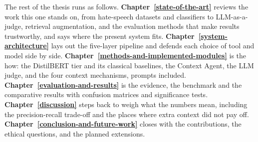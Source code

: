 The rest of the thesis runs as follows. \textbf{Chapter~\ref{state-of-the-art}} reviews the work this one stands on, from hate-speech datasets and classifiers to LLM-as-a-judge, retrieval augmentation, and the evaluation methods that make results trustworthy, and says where the present system fits. \textbf{Chapter~\ref{system-architecture}} lays out the five-layer pipeline and defends each choice of tool and model side by side. \textbf{Chapter~\ref{methods-and-implemented-modules}} is the how: the DistilBERT tier and its classical baselines, the Context Agent, the LLM judge, and the four context mechanisms, prompts included. \textbf{Chapter~\ref{evaluation-and-results}} is the evidence, the benchmark and the comparative results with confusion matrices and significance tests. \textbf{Chapter~\ref{discussion}} steps back to weigh what the numbers mean, including the precision-recall trade-off and the places where extra context did not pay off. \textbf{Chapter~\ref{conclusion-and-future-work}} closes with the contributions, the ethical questions, and the planned extensions.